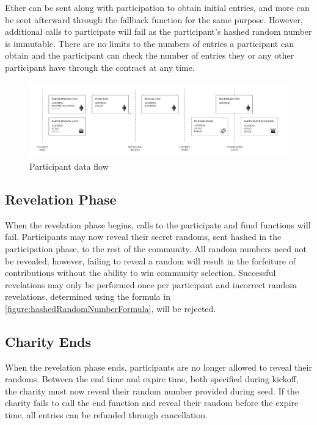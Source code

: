 \documentclass[11pt]{article}
\begin{document}
Ether can be sent along with participation to obtain initial entries, and more can be sent afterward through the fallback function for the same purpose. However, additional calls to participate will fail as the participant's hashed random number is immutable. There are no limits to the numbers of entries a participant can obtain and the participant can check the number of entries they or any other participant have through the contract at any time.

\begin{figure}[H]
\begin{center}
\includegraphics[width=1.0\textwidth]{participantDataFlow.pdf}
\caption{Participant data flow}
\label{figure:participantDataFlow}
\end{center}
\end{figure}

\subsection{Revelation Phase}

When the revelation phase begins, calls to the participate and fund functions will fail. Participants may now reveal their secret randoms, sent hashed in the participation phase, to the rest of the community. All random numbers need not be revealed; however, failing to reveal a random will result in the forfeiture of contributions without the ability to win community selection. Successful revelations may only be performed once per participant and incorrect random revelations, determined using the formula in \ref{figure:hashedRandomNumberFormula}, will be rejected.

\subsection{Charity Ends}

When the revelation phase ends, participants are no longer allowed to reveal their randoms. Between the end time and expire time, both specified during kickoff, the charity must now reveal their random number provided during seed. If the charity fails to call the end function and reveal their random before the expire time, all entries can be refunded through cancellation.
\end{document}
